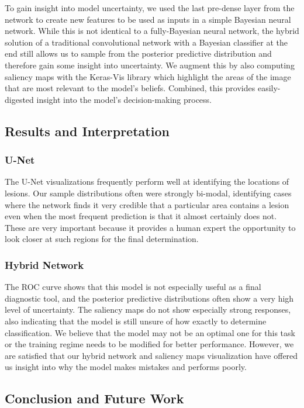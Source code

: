 \documentclass[12pt]{article}
\begin{document}
{To gain insight into model uncertainty, we used the last pre-dense layer from the network to create new features to be used as inputs in a simple Bayesian neural network. While this is not identical to a fully-Bayesian neural network, the hybrid solution of a traditional convolutional network with a Bayesian classifier at the end still allows us to sample from the posterior predictive distribution and therefore gain some insight into uncertainty. We augment this by also computing saliency maps with the Keras-Vis library which highlight the areas of the image that are most relevant to the model's beliefs. Combined, this provides easily-digested insight into the model's decision-making process.

\subsection*{Results and Interpretation}

\subsubsection*{U-Net}
The U-Net visualizations frequently perform well at identifying the locations of lesions. Our sample distributions often were strongly bi-modal, identifying cases where the network finds it very credible that a particular area contains a lesion even when the most frequent prediction is that it almost certainly does not. These are very important because it provides a human expert the opportunity to look closer at such regions for the final determination.

\subsubsection*{Hybrid Network}
The ROC curve shows that this model is not especially useful as a final diagnostic tool, and the posterior predictive distributions often show a very high level of uncertainty. The saliency maps do not show especially strong responses,  also indicating that the model is still unsure of how exactly to determine classification. We believe that the model may not be an optimal one for this task or the training regime needs to be modified for better performance. However, we are satisfied that our hybrid network and saliency maps visualization have offered us insight into why the model makes mistakes and performs poorly.

\subsection*{Conclusion and Future Work}


}
\end{document}
